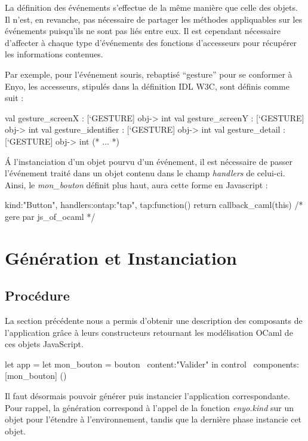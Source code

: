 \documentclass[11pt,a4paper]{report}
\begin{document}
La définition des événements s'effectue de la même manière que celle des objets. Il n'est, en
revanche, pas nécessaire de partager les méthodes appliquables sur les  événements puisqu'ils ne sont pas 
liés entre eux. Il est cependant nécessaire d'affecter à chaque type d'événements des fonctions d'accesseurs pour 
récupérer les informations contenues.

Par exemple, pour l'événement souris, rebaptisé ``gesture'' pour se conformer à Enyo, les accesseurs,
stipulés dans la définition IDL W3C, sont définis comme suit :

\begin{OCaml}
  val gesture_screenX : [`GESTURE] obj-> int
  val gesture_screenY : [`GESTURE] obj-> int
  val gesture_identifier : [`GESTURE] obj-> int
  val gesture_detail : [`GESTURE] obj-> int
  (* ... *)
\end{OCaml}
\medskip

\'A l'instanciation d'un objet pourvu d'un événement, il est nécessaire de passer l'événement traité
dans un objet contenu dans le champ \emph{handlers} de celui-ci. Ainsi, le \emph{mon\_bouton} définit plus haut,
aura cette forme en Javascript :

\begin{JavaScript}
  {kind:"Button", handlers:{ontap:"tap"}, 
    tap:function(){ return callback_caml(this) /* gere par js_of_ocaml */ }}
\end{JavaScript}

\section{Génération et Instanciation}
\subsection{Procédure}

La section précédente nous a permis d'obtenir une description des composants de l'application
grâce à leurs constructeurs retournant les modélisation OCaml de ces objets JavaScript.

\begin{OCaml}
let app = let mon_bouton = bouton ~content:"Valider" in
    control ~components:[mon_bouton] ()
\end{OCaml}

Il faut désormais pouvoir générer puis instancier l'application correspondante. Pour rappel, la génération
correspond à l'appel de la fonction \emph{enyo.kind} sur un objet pour l'étendre à l'environnement,
tandis que la dernière phase instancie cet objet.
\end{document}
